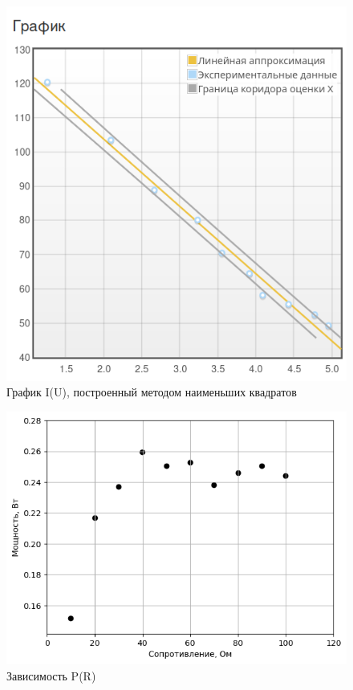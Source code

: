 \documentclass[a4paper,12pt]{article}
\begin{document}
\newpage
\begin{figure}[ht!]
    \centering
    \includegraphics[scale=0.7]{MNK.png}
    \caption{График I(U), построенный методом наименьших квадратов}
\end{figure}

\begin{figure}[ht!]
    \centering
    \includegraphics[scale=0.55]{4.png}
    \caption{Зависимость P(R)}
    \label{fig:enter-label}
\end{figure}
\end{document}
